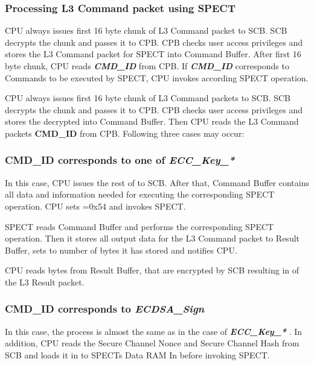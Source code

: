 \documentclass{tropic_design_spec}
\def\LLLCMD{L3 Command packet}
\def\LLLRES{L3 Result packet}
\newcommand{\TsApiCmd}[1]{%
\mbox{\textit{\textbf{#1}}}%
}
\newcommand{\TsApiCmdFld}[1]{%
\mbox{\textbf{#1}}%
}
\begin{document}
\newpage
\subsubsection*{Processing \LLLCMD{} using SPECT}

CPU always issues first 16 byte chunk of \LLLCMD{} to SCB. SCB decrypts the chunk and passes
it to CPB. CPB checks user access privileges and stores the  \LLLCMD{} for SPECT into Command
Buffer. After first 16 byte chunk, CPU reads \TsApiCmd{CMD_ID} from CPB.
If \TsApiCmd{CMD_ID} corresponds to Commands to be executed by SPECT, CPU
invokes according SPECT operation.

CPU always issues first 16 byte chunk of \LLLCMD{}s  to SCB. SCB decrypts the chunk and passes
it to CPB. CPB checks user access privileges and stores the decrypted  into
Command Buffer. Then CPU reads the \LLLCMD{}s \TsApiCmdFld{CMD_ID} from CPB. Following three cases may occur:

\subsubsection*{\TsApiCmdFld{CMD_ID} corresponds to one of \TsApiCmd{ECC_Key_*}}

In this case, CPU issues the rest of  to SCB. After that, Command Buffer contains all data
and information needed for executing the corresponding \linebreak SPECT operation. CPU sets
=0x54 and invokes SPECT.

SPECT reads Command Buffer and performs the corresponding SPECT operation. Then it stores all output
data for the \LLLCMD{} to Result Buffer, sets \linebreak {} to number of bytes
it has stored and notifies CPU.

CPU reads  bytes from Result Buffer, that are encrypted by SCB resulting
in  of the \LLLRES{}.

\subsubsection*{\TsApiCmdFld{CMD_ID} corresponds to \TsApiCmd{ECDSA_Sign}}

In this case, the process is almost the same as in the case of \TsApiCmd{ECC_Key_*}. In addition, CPU reads
the Secure Channel Nonce and Secure Channel Hash from SCB and loads it in to SPECTs Data RAM In before
invoking SPECT.
\end{document}

